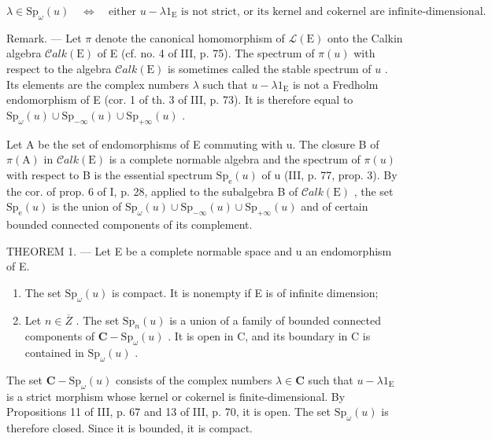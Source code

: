 \(\lambda \in \mathrm{Sp}_{\omega}(u) \quad \Longleftrightarrow \quad \text{either } u - \lambda 1_{\mathrm{E}} \text{ is not strict, or its kernel and cokernel are infinite-dimensional.}\)

Remark. --- Let \(\pi\) denote the canonical homomorphism of \(\mathcal{L}(\mathrm{E})\) onto the Calkin algebra \(\mathcal{C}alk(\mathrm{E})\) of E (cf. no. 4 of III, p. 75). The spectrum of \(\pi(u)\) with respect to the algebra \(\mathcal{C}alk(\mathrm{E})\) is sometimes called the stable spectrum of \(u\) . Its elements are the complex numbers \(\lambda\) such that \(u - \lambda 1_{\mathrm{E}}\) is not a Fredholm endomorphism of E (cor. 1 of th. 3 of III, p. 73). It is therefore equal to \(\mathrm{Sp}_{\omega}(u) \cup \mathrm{Sp}_{-\infty}(u) \cup \mathrm{Sp}_{+\infty}(u)\) .

Let A be the set of endomorphisms of E commuting with u. The closure B of \(\pi(\mathrm{A})\) in \(\mathcal{C}alk(\mathrm{E})\) is a complete normable algebra and the spectrum of \(\pi(u)\) with respect to B is the essential spectrum \(\mathrm{Sp}_{\mathrm{e}}(u)\) of u (III, p. 77, prop. 3). By the cor. of prop. 6 of I, p. 28, applied to the subalgebra B of \(\mathcal{C}alk(\mathrm{E})\) , the set \(\mathrm{Sp}_{\mathrm{e}}(u)\) is the union of \(\mathrm{Sp}_{\omega}(u) \cup \mathrm{Sp}_{-\infty}(u) \cup \mathrm{Sp}_{+\infty}(u)\) and of certain bounded connected components of its complement.

THEOREM 1. --- Let E be a complete normable space and u an endomorphism of E.

\begin{enumerate}
\def\labelenumi{\alph{enumi})}
\item
  The set \(\mathrm{Sp}_{\omega}(u)\) is compact. It is nonempty if E is of infinite dimension;
\item
  Let \(n \in \overline{Z}\) . The set \(\mathrm{Sp}_{n}(u)\) is a union of a family of bounded connected components of \(\mathbf{C} - \mathrm{Sp}_{\omega}(u)\) . It is open in C, and its boundary in C is contained in \(\mathrm{Sp}_{\omega}(u)\) .
\end{enumerate}

The set \(\mathbf{C} - \mathrm{Sp}_{\omega}(u)\) consists of the complex numbers \(\lambda \in \mathbf{C}\) such that \(u - \lambda 1_{\mathrm{E}}\) is a strict morphism whose kernel or cokernel is finite-dimensional. By Propositions 11 of III, p. 67 and 13 of III, p. 70, it is open. The set \(\mathrm{Sp}_{\omega}(u)\) is therefore closed. Since it is bounded, it is compact.

